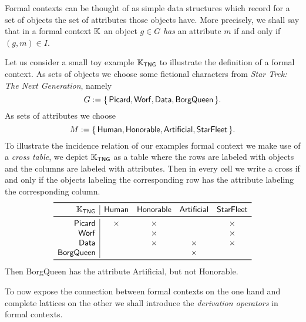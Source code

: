 Formal contexts can be thought of as simple data structures which record for a set of
objects the set of attributes those objects have.  More precisely, we shall say that in a
formal context ${\mathbb{K}}$ an object $g \in G$ \emph{has} an attribute $m$ if and only if
$(g, m) \in I$.

\begin{Example}
  \label{expl:star-trek}
  Let us consider a small toy example ${\mathbb{K}}_{\mathsf{TNG}}$ to illustrate the definition
  of a formal context.  As sets of objects we choose some fictional characters from
  \emph{Star Trek: The Next Generation}, namely
  \begin{equation*}
    G := {\{\, \mathsf{Picard}, \mathsf{Worf}, \mathsf{Data}, \mathsf{BorgQueen} \,\}}.
  \end{equation*}
  As sets of attributes we choose
  \begin{equation*}
    M := {\{\, \mathsf{Human}, \mathsf{Honorable}, \mathsf{Artificial}, \mathsf{Star
        Fleet} \,\}}.
  \end{equation*}
  To illustrate the incidence relation of our examples formal context we make use of a
  \emph{cross table}, \ie we depict ${\mathbb{K}}_{\mathsf{TNG}}$ as a table where the rows are
  labeled with objects and the columns are labeled with attributes.  Then in every cell we
  write a cross if and only if the objects labeling the corresponding row has the
  attribute labeling the corresponding column.
  \begin{equation*}
    \def\x{\times}
    \begin{array}{r|*{4}{c}}
      \toprule
      \con K_{\mathsf{TNG}} & \mathsf{Human} & \mathsf{Honorable} & \mathsf{Artificial} & \mathsf{Star Fleet} \\
      \midrule
      \mathsf{Picard} & \x & \x & & \x \\
      \mathsf{Worf} & & \x & & \x \\
      \mathsf{Data} & & \x & \x & \x \\
      \mathsf{BorgQueen} & & & \x & \\
      \bottomrule
    \end{array}
  \end{equation*}
  Then \textsf{BorgQueen} has the attribute \textsf{Artificial}, but not \textsf{Honorable}.
\end{Example}

To now expose the connection between formal contexts on the one hand and complete lattices
on the other we shall introduce the \emph{derivation operators} in formal contexts.

